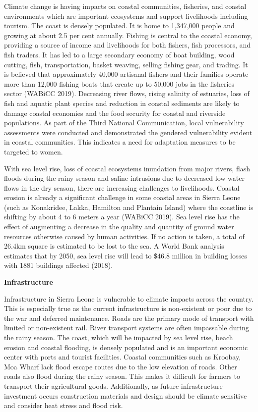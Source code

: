 \documentclass[
]{book}
\begin{document}
Climate change is having impacts on coastal communities, fisheries, and coastal environments which are important ecosystems and support livelihoods including tourism. The coast is densely populated. It is home to 1,347,000 people and growing at about 2.5 per cent annually. Fishing is central to the coastal economy, providing a source of income and livelihoods for both fishers, fish processors, and fish traders. It has led to a large secondary economy of boat building, wood cutting, fish, transportation, basket weaving, selling fishing gear, and trading. It is believed that approximately 40,000 artisanal fishers and their families operate more than 12,000 fishing boats that create up to 50,000 jobs in the fisheries sector (WABiCC 2019). Decreasing river flows, rising salinity of estuaries, loss of fish and aquatic plant species and reduction in coastal sediments are likely to damage coastal economies and the food security for coastal and riverside populations. As part of the Third National Communication, local vulnerability assessments were conducted and demonstrated the gendered vulnerability evident in coastal communities. This indicates a need for adaptation measures to be targeted to women.

With sea level rise, loss of coastal ecosystems inundation from major rivers, flash floods during the rainy season and saline intrusions due to decreased low water flows in the dry season, there are increasing challenges to livelihoods. Coastal erosion is already a significant challenge in some coastal areas in Sierra Leone (such as Konakridee, Lakka, Hamilton and Plantain Island) where the coastline is shifting by about 4 to 6 meters a year (WABiCC 2019). Sea level rise has the effect of augmenting a decrease in the quality and quantity of ground water resources otherwise caused by human activities. If no action is taken, a total of 26.4km square is estimated to be lost to the sea. A World Bank analysis estimates that by 2050, sea level rise will lead to \$46.8 million in building losses with 1881 buildings affected (2018).

\textbf{Infrastructure}

Infrastructure in Sierra Leone is vulnerable to climate impacts across the country. This is especially true as the current infrastructure is non-existent or poor due to the war and deferred maintenance. Roads are the primary mode of transport with limited or non-existent rail. River transport systems are often impassable during the rainy season. The coast, which will be impacted by sea level rise, beach erosion and coastal flooding, is densely populated and is an important economic center with ports and tourist facilities. Coastal communities such as Kroobay, Moa Wharf lack flood escape routes due to the low elevation of roads. Other roads also flood during the rainy season. This makes it difficult for farmers to transport their agricultural goods. Additionally, as future infrastructure investment occurs construction materials and design should be climate sensitive and consider heat stress and flood risk.
\end{document}
